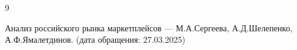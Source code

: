 \begin{thebibliography}{9}
	
	 Анализ российского рынка маркетплейсов --- М.А.Сергеева, А.Д.Шелепенко, А.Ф.Ямалетдинов. (дата обращения: 27.03.2025)
	
\end{thebibliography}
